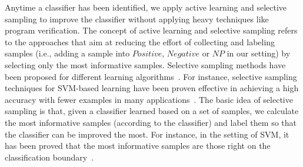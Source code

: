Anytime a classifier has been identified, we apply active learning and selective sampling to improve the classifier without applying heavy techniques like program verification.
The concept of active learning and selective sampling refers to the approaches that aim at reducing the effort of collecting and labeling samples (i.e., adding a sample into $Positive$, $Negative$ or $NP$ in our setting) by selecting only the most informative samples. Selective sampling methods have been proposed for different learning algorithms~\cite{DBLP:conf/icml/OrabonaC11}. 
For instance, selective sampling techniques for SVM-based learning have been proven effective in achieving a
high accuracy with fewer examples in many applications~\cite{DBLP:conf/icml/OrabonaC11,DBLP:conf/mm/TongC01,DBLP:journals/jmlr/TongK01}. 
The basic idea of selective sampling is that, given a classifier learned based on a set of samples, we calculate the most informative samples (according to the classifier) and label them so that the classifier can be improved the most. 
For instance, in the setting of SVM, it has been proved that the most informative samples are those right on the classification boundary~\cite{DBLP:conf/icml/OrabonaC11}.
